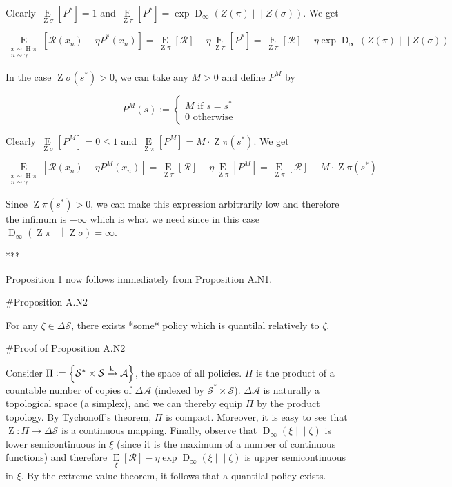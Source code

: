 \documentclass[a4paper]{article}
\newcommand{\AP}[1]{\left(#1\right)}
\newcommand{\AB}[1]{\left[#1\right]}
\newcommand{\AC}[1]{\left\{#1\right\}}
\newcommand{\Ea}[2]{\underset{#1}{\operatorname{E}}\AB{#2}}
\newcommand{\RD}[3]{\operatorname{D}_{#1}\AP{#2\middle\vert\middle\vert#3}}
\newcommand{\K}{\xrightarrow{\textnormal{k}}}
\newcommand{\A}{\mathcal{A}}
\newcommand{\St}{\mathcal{S}}
\newcommand{\R}{\mathcal{R}}
\newcommand{\Pe}{P}
\DeclareMathOperator{\Hi}{H}
\DeclareMathOperator{\Z}{Z}
\begin{document}
Clearly $\Ea{\Z{\sigma}}{\Pe^*} = 1$ and $\Ea{\Z{\pi}}{P^*} = \exp{\RD{\infty}{Z(\pi)}{Z(\sigma)}}$. We get

$$\Ea{\substack{x\sim\Hi{\pi}\\n\sim\gamma}}{\R\AP{x_n}-\eta\Pe^*\AP{x_n}} = \Ea{\Z{\pi}}{\R} - \eta \Ea{\Z{\pi}}{\Pe^*} = \Ea{\Z{\pi}}{\R} - \eta\exp{\RD{\infty}{Z(\pi)}{Z(\sigma)}}$$

In the case $\Z{\sigma}\AP{s^*} > 0$, we can take any $M > 0$ and define $\Pe^M$ by

$$\Pe^M(s):=\begin{cases} M \text{ if } s=s^* \\ 0 \text{ otherwise} \end{cases}$$

Clearly $\Ea{\Z{\sigma}}{\Pe^M} = 0 \leq 1$ and $\Ea{\Z{\pi}}{P^M} = M \cdot \Z{\pi}\AP{s^*}$. We get

$$\Ea{\substack{x\sim\Hi{\pi}\\n\sim\gamma}}{\R\AP{x_n}-\eta\Pe^M\AP{x_n}} = \Ea{\Z{\pi}}{\R} - \eta \Ea{\Z{\pi}}{\Pe^M} = \Ea{\Z{\pi}}{\R} - M \cdot \Z{\pi}\AP{s^*}$$

Since $\Z{\pi}\AP{s^*} > 0$, we can make this expression arbitrarily low and therefore the infimum is $-\infty$ which is what we need since in this case $\RD{\infty}{\Z{\pi}}{\Z{\sigma}} = \infty$.

***

Proposition 1 now follows immediately from Proposition A.N1.

\#Proposition A.N2

For any $\zeta\in\Delta\St$, there exists *some* policy which is quantilal relatively to $\zeta$.

\#Proof of Proposition A.N2

Consider $\Pi:=\AC{\St^* \times \St \K \A}$, the space of all policies. $\Pi$ is the product of a countable number of copies of $\Delta\A$ (indexed by $\St^* \times \St$). $\Delta\A$ is naturally a topological space (a simplex), and we can thereby equip $\Pi$ by the product topology. By Tychonoff's theorem, $\Pi$ is compact. Moreover, it is easy to see that $\Z: \Pi \rightarrow \Delta\St$ is a continuous mapping. Finally, observe that $\RD{\infty}{\xi}{\zeta}$ is lower semicontinuous in $\xi$ (since it is the maximum of a number of continuous functions) and therefore $\Ea{\xi}{\R} - \eta\exp{\RD{\infty}{\xi}{\zeta}}$ is upper semicontinuous in $\xi$. By the extreme value theorem, it follows that a quantilal policy exists.
\end{document}
